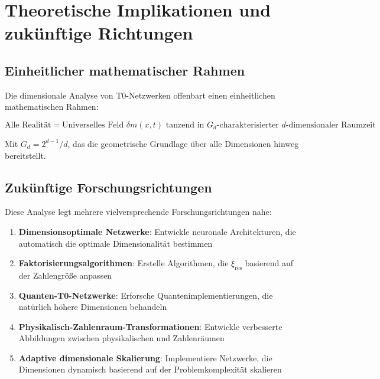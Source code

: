 \documentclass[12pt,a4paper]{article}
\newcommand{\xipar}{\ensuremath{\xi}}
\newcommand{\deltafield}{\ensuremath{\delta m}}
\begin{document}
	\section{Theoretische Implikationen und zukünftige Richtungen}
	\label{sec:theoretical_implications}
	
	\subsection{Einheitlicher mathematischer Rahmen}
	\label{subsec:unified_framework}
	
	Die dimensionale Analyse von T0-Netzwerken offenbart einen einheitlichen mathematischen Rahmen:
	
	\begin{tcolorbox}[colback=green!5!white,colframe=green!75!black,title=Einheitlicher T0-mathematischer Rahmen]
		\begin{equation}
			\boxed{\text{Alle Realität} = \text{Universelles Feld } \deltafield(x,t) \text{ tanzend in } G_d\text{-charakterisierter }d\text{-dimensionaler Raumzeit}}
		\end{equation}
		
		Mit $G_d = 2^{d-1}/d$, das die geometrische Grundlage über alle Dimensionen hinweg bereitstellt.
	\end{tcolorbox}
	
	\subsection{Zukünftige Forschungsrichtungen}
	\label{subsec:future_research}
	
	Diese Analyse legt mehrere vielversprechende Forschungsrichtungen nahe:
	
	\begin{enumerate}
		\item \textbf{Dimensionsoptimale Netzwerke}: Entwickle neuronale Architekturen, die automatisch die optimale Dimensionalität bestimmen
		\item \textbf{Faktorisierungsalgorithmen}: Erstelle Algorithmen, die $\xipar_{\text{res}}$ basierend auf der Zahlengröße anpassen
		\item \textbf{Quanten-T0-Netzwerke}: Erforsche Quantenimplementierungen, die natürlich höhere Dimensionen behandeln
		\item \textbf{Physikalisch-Zahlenraum-Transformationen}: Entwickle verbesserte Abbildungen zwischen physikalischen und Zahlenräumen
		\item \textbf{Adaptive dimensionale Skalierung}: Implementiere Netzwerke, die Dimensionen dynamisch basierend auf der Problemkomplexität skalieren
	\end{enumerate}
	
\end{document}
